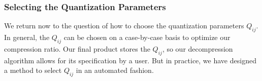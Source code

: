 \documentclass{article}
\begin{document}

\subsubsection{Selecting the Quantization Parameters} 
\label{sec:Q_ij} 
We return now to the question of how to choose the quantization parameters $Q_{ij}$. In general, the $Q_{ij}$ can be chosen on a case-by-case basis to optimize our compression ratio. Our final product stores the $Q_{ij}$, so our decompression algorithm allows for its specification by a user. But in practice, we have designed a method to select $Q_{ij}$ in an automated fashion. 
\end{document}
